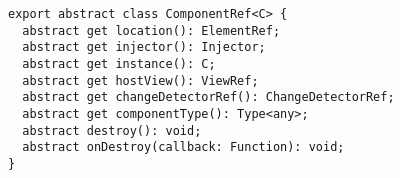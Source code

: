 \begin{verbatim}
export abstract class ComponentRef<C> {
  abstract get location(): ElementRef;
  abstract get injector(): Injector;
  abstract get instance(): C;
  abstract get hostView(): ViewRef;
  abstract get changeDetectorRef(): ChangeDetectorRef;
  abstract get componentType(): Type<any>;
  abstract destroy(): void;
  abstract onDestroy(callback: Function): void;
}
\end{verbatim}
